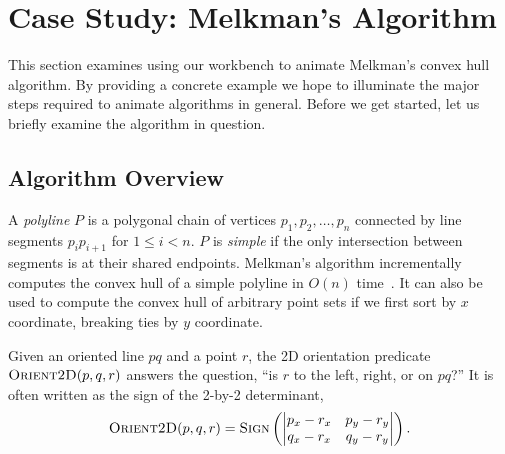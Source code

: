 
\FloatBarrier
\section{Case Study: Melkman's Algorithm}

This section examines using our workbench to animate Melkman's convex hull
algorithm. By providing a concrete example we hope to illuminate the major steps
required to animate algorithms in general. Before we get started, let us briefly
examine the algorithm in question.

\subsection{Algorithm Overview}

A \emph{polyline} $P$ is a polygonal chain of vertices $p_1, p_2, \ldots, p_n$
connected by line segments $p_ip_{i+1}$ for $1 \leq i < n$. $P$ is \emph{simple}
if the only intersection between segments is at their shared endpoints.
Melkman's algorithm incrementally computes the convex hull of a simple polyline
in $O(n)$ time~\cite{melkman1987line}. It can also be used to compute the convex
hull of arbitrary point sets if we first sort by $x$ coordinate, breaking ties
by $y$ coordinate.

Given an oriented line $pq$ and a point $r$, the 2D orientation predicate
$\textsc{Orient2D}(p, q, r)$ answers the question, ``is $r$ to the left, right,
or on $pq$?'' It is often written as the sign of the 2-by-2 determinant, $$
\textsc{Orient2D}(p, q, r) = \textsc{Sign}\left( \begin{vmatrix} p_x-r_x &
p_y-r_y \\ q_x-r_x & q_y-r_y \end{vmatrix} \right).$$


